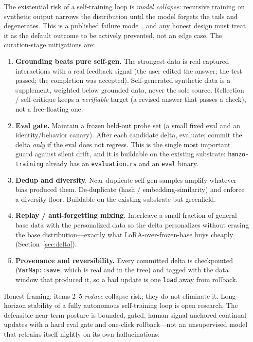 \documentclass[11pt]{article}
\begin{document}
The existential risk of a self-training loop is \emph{model collapse}: recursive training on synthetic output narrows the distribution until the model forgets the tails and degenerates. This is a published failure mode~\cite{collapse}, and any honest design must treat it as the default outcome to be actively prevented, not an edge case. The curation-stage mitigations are:
\begin{enumerate}
    \item \textbf{Grounding beats pure self-gen.} The strongest data is real captured interactions with a real feedback signal (the user edited the answer; the test passed; the completion was accepted). Self-generated synthetic data is a supplement, weighted below grounded data, never the sole source. Reflection / self-critique keeps a \emph{verifiable} target (a revised answer that passes a check), not a free-floating one.
    \item \textbf{Eval gate.} Maintain a frozen held-out probe set (a small fixed eval and an identity/behavior canary). After each candidate delta, evaluate; commit the delta \emph{only} if the eval does not regress. This is the single most important guard against silent drift, and it is buildable on the existing substrate: \texttt{hanzo-training} already has an \texttt{evaluation.rs} and an \texttt{eval} binary.
    \item \textbf{Dedup and diversity.} Near-duplicate self-gen samples amplify whatever bias produced them. De-duplicate (hash / embedding-similarity) and enforce a diversity floor. Buildable on the existing substrate but greenfield.
    \item \textbf{Replay / anti-forgetting mixing.} Interleave a small fraction of general base data with the personalized data so the delta personalizes without erasing the base distribution---exactly what LoRA-over-frozen-base buys cheaply (Section~\ref{sec:delta}).
    \item \textbf{Provenance and reversibility.} Every committed delta is checkpointed (\texttt{VarMap::save}, which is real and in the tree) and tagged with the data window that produced it, so a bad update is one \texttt{load} away from rollback.
\end{enumerate}

Honest framing: items 2--5 \emph{reduce} collapse risk; they do not eliminate it. Long-horizon stability of a fully autonomous self-training loop is open research. The defensible near-term posture is bounded, gated, human-signal-anchored continual updates with a hard eval gate and one-click rollback---not an unsupervised model that retrains itself nightly on its own hallucinations.
\end{document}
